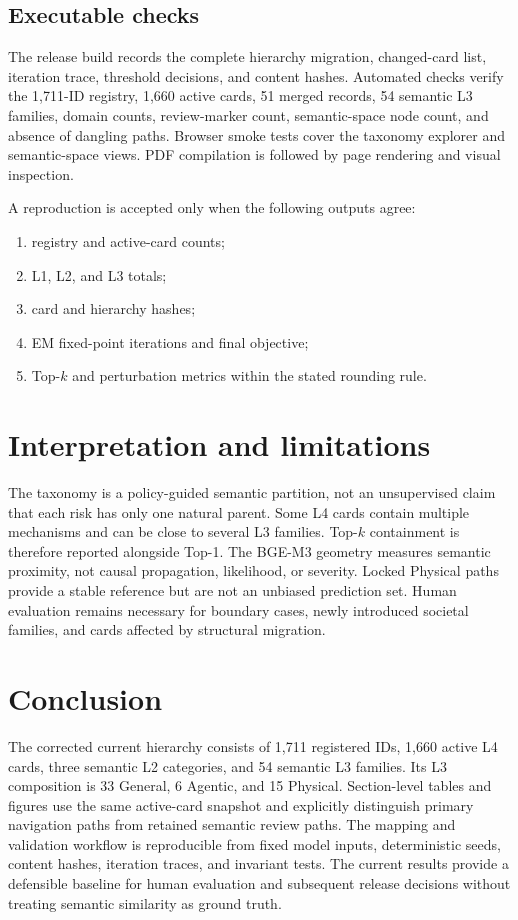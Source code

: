 \documentclass[11pt,a4paper]{article}
\begin{document}
\subsection{Executable checks}

The release build records the complete hierarchy migration, changed-card list,
iteration trace, threshold decisions, and content hashes. Automated checks
verify the 1,711-ID registry, 1,660 active cards, 51 merged records, 54 semantic
L3 families, domain counts, review-marker count, semantic-space node count,
and absence of dangling paths. Browser smoke tests cover the taxonomy explorer
and semantic-space views. PDF compilation is followed by page rendering and
visual inspection.

A reproduction is accepted only when the following outputs agree:
\begin{enumerate}[leftmargin=2em]
  \item registry and active-card counts;
  \item L1, L2, and L3 totals;
  \item card and hierarchy hashes;
  \item EM fixed-point iterations and final objective;
  \item Top-$k$ and perturbation metrics within the stated rounding rule.
\end{enumerate}

\section{Interpretation and limitations}

The taxonomy is a policy-guided semantic partition, not an unsupervised claim
that each risk has only one natural parent. Some L4 cards contain multiple
mechanisms and can be close to several L3 families. Top-$k$ containment is
therefore reported alongside Top-1. The BGE-M3 geometry measures semantic
proximity, not causal propagation, likelihood, or severity. Locked Physical
paths provide a stable reference but are not an unbiased prediction set.
Human evaluation remains necessary for boundary cases, newly introduced
societal families, and cards affected by structural migration.

\section{Conclusion}

The corrected current hierarchy consists of 1,711 registered IDs, 1,660 active
L4 cards, three semantic L2 categories, and 54 semantic L3 families. Its L3
composition is 33 General, 6 Agentic, and 15 Physical. Section-level tables and
figures use the same active-card snapshot and explicitly distinguish primary
navigation paths from retained semantic review paths. The mapping and
validation workflow is reproducible from fixed model inputs, deterministic
seeds, content hashes, iteration traces, and invariant tests. The current
results provide a defensible baseline for human evaluation and subsequent
release decisions without treating semantic similarity as ground truth.
\end{document}
